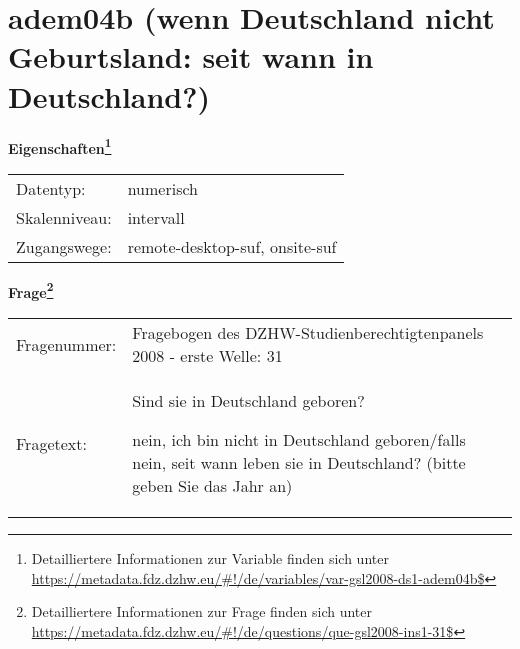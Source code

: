 
    \setcounter{footnote}{0}

    \vspace*{-1.8cm}
	\section{adem04b (wenn Deutschland nicht Geburtsland: seit wann in Deutschland?)}
	\label{section:adem04b}



    \vspace*{0.5cm}
    \noindent\textbf{Eigenschaften\footnote{Detailliertere Informationen zur Variable finden sich unter
		\url{https://metadata.fdz.dzhw.eu/\#!/de/variables/var-gsl2008-ds1-adem04b$}}}\\
	\begin{tabularx}{\hsize}{@{}lX}
	Datentyp: & numerisch \\
	Skalenniveau: & intervall \\
	Zugangswege: &
	  remote-desktop-suf, 
	  onsite-suf
 \\
    \end{tabularx}



				\vspace*{0.5cm}
                \noindent\textbf{Frage\footnote{Detailliertere Informationen zur Frage finden sich unter
		              \url{https://metadata.fdz.dzhw.eu/\#!/de/questions/que-gsl2008-ins1-31$}}}\\
				\begin{tabularx}{\hsize}{@{}lX}
					Fragenummer: &
					  Fragebogen des DZHW-Studienberechtigtenpanels 2008 - erste Welle:
					  31
 \\
					Fragetext: & Sind sie in Deutschland geboren?\par  nein, ich bin nicht in Deutschland geboren/falls nein, seit wann leben sie in Deutschland? (bitte geben Sie das Jahr an) \\
				\end{tabularx}





